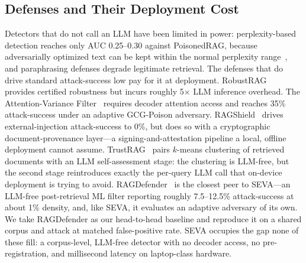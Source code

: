 \documentclass[10pt,journal,compsoc]{IEEEtran}
\begin{document}
\subsection{Defenses and Their Deployment Cost}
Detectors that do not call an LLM have been limited in power: perplexity-based
detection reaches only AUC 0.25--0.30 against PoisonedRAG, because adversarially
optimized text can be kept within the normal perplexity
range~\cite{poisonedrag}, and paraphrasing defenses degrade legitimate
retrieval. The defenses that do drive standard attack-success low pay for it at
deployment. RobustRAG~\cite{robustrag} provides certified robustness but incurs
roughly 5$\times$ LLM inference overhead. The Attention-Variance
Filter~\cite{avfilter} requires decoder attention access and reaches 35\%
attack-success under an adaptive GCG-Poison adversary. RAGShield~\cite{ragshield}
drives external-injection attack-success to 0\%, but does so with a cryptographic
document-provenance layer---a signing-and-attestation pipeline a local, offline deployment
cannot assume.
TrustRAG~\cite{trustrag} pairs $k$-means clustering of retrieved documents with an
LLM self-assessment stage: the clustering is LLM-free, but the second stage
reintroduces exactly the per-query LLM call that on-device deployment is trying to
avoid. RAGDefender~\cite{ragdefender} is the closest peer to SEVA---an LLM-free
post-retrieval ML filter reporting roughly 7.5--12.5\% attack-success at about
1\% density, and, like SEVA, it evaluates an adaptive adversary of its own. We
take RAGDefender as our head-to-head baseline and reproduce it on a shared corpus
and attack at matched false-positive rate.
SEVA occupies the gap none of these fill: a corpus-level, LLM-free detector with
no decoder access, no pre-registration, and millisecond latency on laptop-class
hardware.
\end{document}
